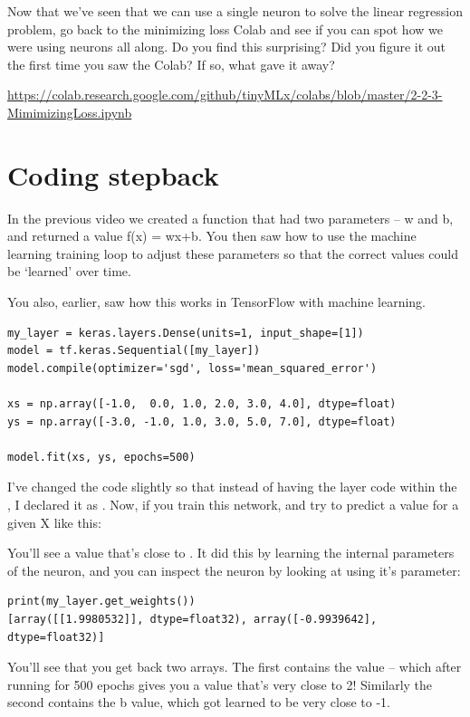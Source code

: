 Now that we’ve seen that we can use a single neuron to solve the linear regression problem, go back to the minimizing loss Colab and see if you can spot how we were using neurons all along. Do you find this surprising? Did you figure it out the first time you saw the Colab? If so, what gave it away?

\url{https://colab.research.google.com/github/tinyMLx/colabs/blob/master/2-2-3-MimimizingLoss.ipynb}

\section{Coding stepback}

In the previous video we created a function that had two parameters -- w and b, and returned a value f(x) = wx+b. You then saw how to use the machine learning training loop to adjust these parameters so that the correct values could be ‘learned’ over time.

You also, earlier, saw how this works in TensorFlow with machine learning.

\begin{lstlisting}
my_layer = keras.layers.Dense(units=1, input_shape=[1])
model = tf.keras.Sequential([my_layer])
model.compile(optimizer='sgd', loss='mean_squared_error')

xs = np.array([-1.0,  0.0, 1.0, 2.0, 3.0, 4.0], dtype=float)
ys = np.array([-3.0, -1.0, 1.0, 3.0, 5.0, 7.0], dtype=float)

model.fit(xs, ys, epochs=500)
\end{lstlisting}

I've changed the code slightly so that instead of having the layer code within the , I declared it as . Now, if you train this network, and try to predict a value for a given X like this:


You'll see a value that's close to . It did this by learning the internal parameters of the neuron, and you can inspect the neuron by looking at  using it's  parameter:


\begin{lstlisting}
print(my_layer.get_weights())
[array([[1.9980532]], dtype=float32), array([-0.9939642], dtype=float32)]
\end{lstlisting}

You'll see that you get back two arrays. The first contains the  value -- which after running for 500 epochs gives you a value that's very close to 2! Similarly the second contains the b value, which got learned to be very close to -1.

